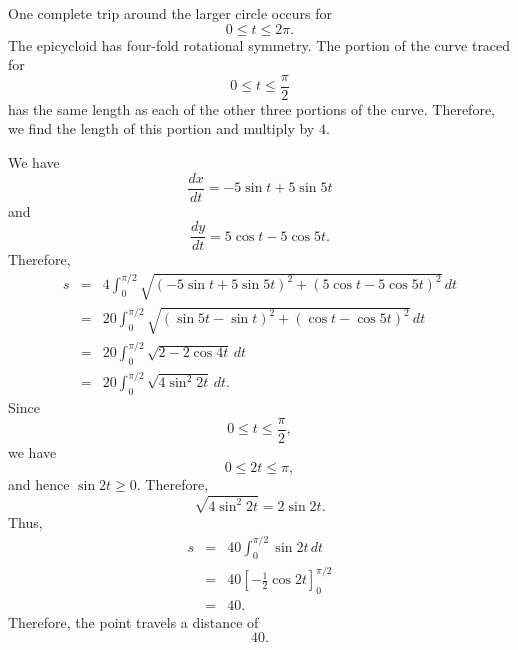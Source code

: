 \documentclass[11pt,letterpaper]{article}
\begin{document}
\begin{enumerate}
One complete trip around the larger circle occurs for
\[
0\leq t\leq2\pi.
\]
The epicycloid has four-fold rotational symmetry.  The portion of the curve
traced for
\[
0\leq t\leq\frac{\pi}{2}
\]
has the same length as each of the other three portions of the curve.
Therefore, we find the length of this portion and multiply by $4$.

We have
\[
\frac{dx}{dt}=-5\sin t+5\sin 5t
\]
and
\[
\frac{dy}{dt}=5\cos t-5\cos 5t.
\]
Therefore,
\begin{eqnarray*}
s
&=&
4\int_{0}^{\pi/2}
\sqrt{
\left(-5\sin t+5\sin 5t\right)^{2}
+
\left(5\cos t-5\cos 5t\right)^{2}
}\,dt\\
&=&
20\int_{0}^{\pi/2}
\sqrt{
(\sin 5t-\sin t)^{2}
+
(\cos t-\cos 5t)^{2}
}\,dt\\
&=&
20\int_{0}^{\pi/2}
\sqrt{2-2\cos 4t}\,dt\\
&=&
20\int_{0}^{\pi/2}
\sqrt{4\sin^{2}2t}\,dt.
\end{eqnarray*}
Since
\[
0\leq t\leq\frac{\pi}{2},
\]
we have
\[
0\leq2t\leq\pi,
\]
and hence $\sin 2t\geq0$.  Therefore,
\[
\sqrt{4\sin^{2}2t}=2\sin 2t.
\]
Thus,
\begin{eqnarray*}
s
&=&
40\int_{0}^{\pi/2}\sin 2t\,dt\\
&=&
40\left[-\frac{1}{2}\cos 2t\right]_{0}^{\pi/2}\\
&=&
40.
\end{eqnarray*}
Therefore, the point travels a distance of
\[
\boxed{40}.
\]

\end{enumerate}
\end{document}
